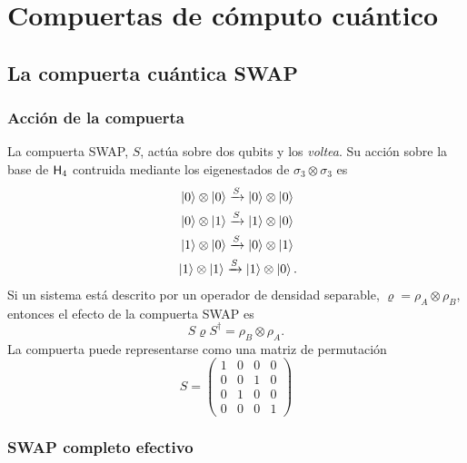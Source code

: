 \section{Compuertas de cómputo cuántico}
\subsection{La compuerta cuántica SWAP}

\subsubsection{Acción de la compuerta}
La compuerta SWAP, $S$, actúa sobre dos qubits y los \textit{voltea}. Su acción sobre la base de ${\sf H}_{4}$ contruida mediante los eigenestados de $\sigma_{3}\otimes\sigma_{3}$ es
\begin{align*}
    \ket{0}\otimes\ket{0}\xrightarrow{S}\ket{0}\otimes\ket{0}\\
    \ket{0}\otimes\ket{1}\xrightarrow{S}\ket{1}\otimes\ket{0}\\
    \ket{1}\otimes\ket{0}\xrightarrow{S}\ket{0}\otimes\ket{1}\\
    \ket{1}\otimes\ket{1}\xrightarrow{S}\ket{1}\otimes\ket{0} \rlap{.}
\end{align*}
Si un sistema está descrito por un operador de densidad separable, $\varrho=\rho_{A}\otimes\rho_{B}$, entonces el efecto de la compuerta SWAP es 
\begin{equation*}
    S\varrho S^{\dag}=\rho_{B}\otimes\rho_{A}.
\end{equation*}
La compuerta puede representarse como una matriz de permutación
\begin{equation*}
    S=\begin{pmatrix}
        1&0&0&0\\
        0&0&1&0\\
        0&1&0&0\\
        0&0&0&1
    \end{pmatrix}
\end{equation*}
\subsubsection{SWAP completo efectivo}

